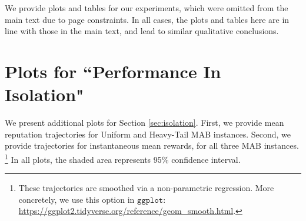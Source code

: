 \documentclass[../competing_bandits_with_appendix.tex]{subfiles}
\begin{document}
We provide plots and tables for our experiments, which were omitted from the main text due to page constraints. In all cases, the plots and tables here are in line with those in the main text, and lead to similar qualitative conclusions.

\section{Plots for ``Performance In Isolation"}

We present additional plots for Section \ref{sec:isolation}. First, we provide mean reputation trajectories for Uniform and Heavy-Tail MAB instances. Second, we provide trajectories for instantaneous mean rewards, for all three MAB instances.%
\footnote{These trajectories are smoothed via a non-parametric regression.
More concretely, we use this option in $\texttt{ggplot}$:
\url{https://ggplot2.tidyverse.org/reference/geom_smooth.html}.}
In all plots, the shaded area represents 95\% confidence interval.
\end{document}
